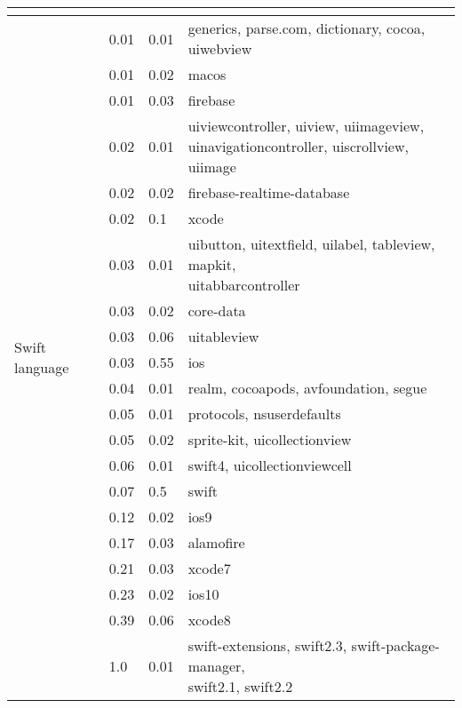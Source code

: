 \begin{longtable}{|l|l|l|l|}
\multicolumn{4}{|l|}{}                                    \\ \hline
\multirow{25}{*}{Swift language}               & 0.01  &  0.01  &  generics, parse.com, dictionary, cocoa, uiwebview   \\ \cline{2-4}
               & 0.01  &  0.02  &  macos   \\ \cline{2-4}
               & 0.01  &  0.03  &  firebase   \\ \cline{2-4}
               & 0.02  &  0.01  &  \makecell[l]{uiviewcontroller, uiview, uiimageview,\\ uinavigationcontroller, uiscrollview, uiimage}   \\ \cline{2-4}
               & 0.02  &  0.02  &  firebase-realtime-database   \\ \cline{2-4}
               & 0.02  &  0.1  &  xcode   \\ \cline{2-4}
               & 0.03  &  0.01  &  \makecell[l]{uibutton, uitextfield, uilabel, tableview, mapkit,\\ uitabbarcontroller}   \\ \cline{2-4}
               & 0.03  &  0.02  &  core-data   \\ \cline{2-4}
               & 0.03  &  0.06  &  uitableview   \\ \cline{2-4}
               & 0.03  &  0.55  &  ios   \\ \cline{2-4}
               & 0.04  &  0.01  &  realm, cocoapods, avfoundation, segue   \\ \cline{2-4}
               & 0.05  &  0.01  &  protocols, nsuserdefaults   \\ \cline{2-4}
               & 0.05  &  0.02  &  sprite-kit, uicollectionview   \\ \cline{2-4}
               & 0.06  &  0.01  &  swift4, uicollectionviewcell   \\ \cline{2-4}
               & 0.07  &  0.5  &  swift   \\ \cline{2-4}
               & 0.12  &  0.02  &  ios9   \\ \cline{2-4}
               & 0.17  &  0.03  &  alamofire   \\ \hline
               \pagebreak
               \hline
               & 0.21  &  0.03  &  xcode7   \\ \cline{2-4}
               & 0.23  &  0.02  &  ios10   \\ \cline{2-4}
               & 0.39  &  0.06  &  xcode8   \\ \cline{2-4}
               & 1.0  &  0.01  &  \makecell[l]{swift-extensions, swift2.3, swift-package-manager,\\ swift2.1, swift2.2}   \\ \cline{2-4}

\end{longtable}

